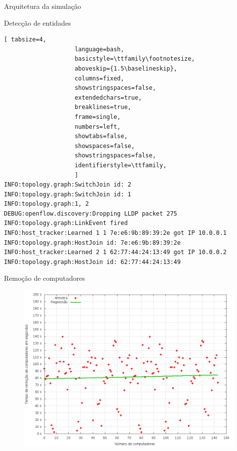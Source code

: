 \begin{frame}{Arquitetura da simulação}

    
\end{frame}


\begin{frame}[fragile]{Detecção de entidades}

\begin{lstlisting}[ tabsize=4,  
                    language=bash,
                    basicstyle=\ttfamily\footnotesize,
                    aboveskip={1.5\baselineskip},
                    columns=fixed,
                    showstringspaces=false,
                    extendedchars=true,
                    breaklines=true,
                    frame=single,
                    numbers=left,
                    showtabs=false,
                    showspaces=false,
                    showstringspaces=false,
                    identifierstyle=\ttfamily,
                    ]
INFO:topology.graph:SwitchJoin id: 2
INFO:topology.graph:SwitchJoin id: 1
INFO:topology.graph:1, 2
DEBUG:openflow.discovery:Dropping LLDP packet 275
INFO:topology.graph:LinkEvent fired
INFO:host_tracker:Learned 1 1 7e:e6:9b:89:39:2e got IP 10.0.0.1
INFO:topology.graph:HostJoin id: 7e:e6:9b:89:39:2e
INFO:host_tracker:Learned 2 1 62:77:44:24:13:49 got IP 10.0.0.2
INFO:topology.graph:HostJoin id: 62:77:44:24:13:49
\end{lstlisting}

\end{frame}


\begin{frame}{Remoção de computadores}

    \begin{figure}[!htb]
        \centering
        \includegraphics[scale=.35]{images/hosts-leave-time}
    \end{figure}

\end{frame}


